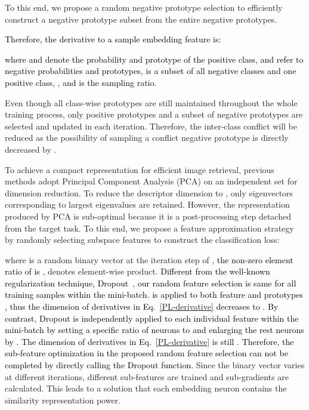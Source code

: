 \documentclass{article} \usepackage{iclr2023_conference,times}
\begin{document}
To this end, we propose a random negative prototype selection to efficiently construct a negative prototype subset from the entire negative prototypes. \textcolor{black}{Therefore, the derivative to a sample embedding feature is:
\vspace{-2mm}

where  and  denote the probability and prototype of the positive class,  and  refer to negative probabilities and prototypes,  is a subset of all negative classes and one positive class, , and  is the sampling ratio.}
Even though all class-wise prototypes are still maintained throughout the whole training process, only positive prototypes and a subset of negative prototypes are selected and updated in each iteration.
Therefore, the inter-class conflict will be reduced as the possibility of sampling a conflict negative prototype is directly decreased by . 


To achieve a compact representation for efficient image retrieval, previous methods \citep{babenko2015aggregating,tolias2016particular} adopt Principal Component Analysis (PCA) on an independent set for dimension reduction. 
To reduce the descriptor dimension to , only eigenvectors corresponding to  largest eigenvalues are retained. 
However, the representation produced by PCA is sub-optimal because it is a post-processing step detached from the target task.
To this end, we propose a feature approximation strategy by randomly selecting subspace features to construct the classification loss: 

\vspace{-2mm}

where  is a random binary vector at the iteration step of , \textcolor{black}{the non-zero element ratio of  is },  denotes element-wise product.
\textcolor{black}{
Different from the well-known regularization technique, Dropout~\citep{srivastava2014dropout}, our random feature selection  is same for all training samples within the mini-batch.  is applied to both feature  and prototypes , thus the dimension of derivatives in Eq.~\ref{PL-derivative} decreases to . By contrast, Dropout is independently applied to each individual feature  within the mini-batch by setting a specific ratio  of neurons to  and enlarging the rest neurons by . The dimension of derivatives in Eq.~\ref{PL-derivative} is still . Therefore, the sub-feature optimization in the proposed random feature selection can not be completed by directly calling the Dropout function.} 
Since the binary vector varies at different iterations, different sub-features are trained and sub-gradients are calculated. This leads to a solution that each embedding neuron contains the similarity representation power. 
\end{document}
